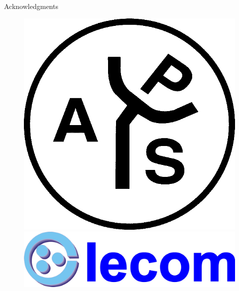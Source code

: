 \documentclass[aspectratio=169]{beamer}
\begin{document}
\begin{frame}[plain]{Acknowledgments}
\begin{center}
\begin{figure}[H]
\begin{minipage}[h]{.3\linewidth}
\includegraphics[scale=0.9]{images/aps.png}
\end{minipage}
\hspace{1.0cm}
\begin{minipage}[h]{.4\linewidth}
\includegraphics[scale=2.5]{images/iecom.png}
\end{minipage}
\end{figure}
\end{center}

\hspace{3.5cm}


\end{frame}
\end{document}
